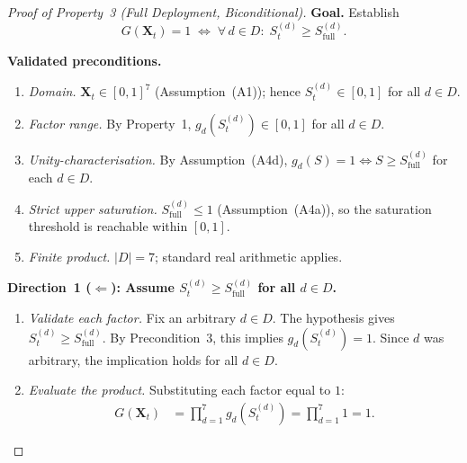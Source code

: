 \documentclass[12pt,openany]{book}
\numberwithin{equation}{chapter}
\theoremstyle{plain}
\theoremstyle{definition}
\theoremstyle{remark}
\def\mathcal#1{#1}%
\begin{document}
\begin{proof}[Proof of Property~3 (Full Deployment, Biconditional)]
\textbf{Goal.}  Establish
\begin{equation}
  G(\mathbf{X}_t) = 1
  \;\Longleftrightarrow\;
  \forall\, d \in \mathcal{D}:\;
  \mathcal{S}_t^{(d)} \geq \mathcal{S}_{\mathrm{full}}^{(d)}.
  \label{eq:P3-goal}
\end{equation}

\medskip\noindent
\textbf{Validated preconditions.}
\begin{enumerate}
  \item \emph{Domain.}  $\mathbf{X}_t\in[0,1]^7$
        (Assumption~(A1)); hence
        $\mathcal{S}_t^{(d)}\in[0,1]$ for all
        $d\in\mathcal{D}$.
  \item \emph{Factor range.}  By Property~1,
        $g_d\!\left(\mathcal{S}_t^{(d)}\right)\in[0,1]$
        for all $d\in\mathcal{D}$.
  \item \emph{Unity-characterisation.}
        By Assumption~(A4d),
        $g_d(\mathcal{S})=1 \Leftrightarrow
         \mathcal{S}\geq\mathcal{S}_{\mathrm{full}}^{(d)}$
        for each $d\in\mathcal{D}$.
  \label{rem:saturation}
  \item \emph{Strict upper saturation.}
        $\mathcal{S}_{\mathrm{full}}^{(d)}\leq 1$
        (Assumption~(A4a)), so the saturation threshold
        is reachable within $[0,1]$.
  \item \emph{Finite product.}
        $|\mathcal{D}|=7$; standard real arithmetic applies.
\end{enumerate}

\medskip
\noindent
\textbf{Direction~1 ($\Leftarrow$): Assume
$\mathcal{S}_t^{(d)}\geq\mathcal{S}_{\mathrm{full}}^{(d)}$
for all $d\in\mathcal{D}$.}
\begin{enumerate}
  \item \emph{Validate each factor.}
        Fix an arbitrary $d\in\mathcal{D}$.
        The hypothesis gives
        $\mathcal{S}_t^{(d)}\geq\mathcal{S}_{\mathrm{full}}^{(d)}$.
        By Precondition~3, this implies
        $g_d\!\left(\mathcal{S}_t^{(d)}\right)=1$.
        Since $d$ was arbitrary, the implication holds
        for all $d\in\mathcal{D}$.

  \item \emph{Evaluate the product.}
        Substituting each factor equal to $1$:
        \begin{align}
          G(\mathbf{X}_t)
          &= \prod_{d=1}^{7}
               g_d\!\left(\mathcal{S}_t^{(d)}\right)
           = \prod_{d=1}^{7} 1
           = 1.
          \label{eq:P3-bwd-result}
        \end{align}


\end{enumerate}
\end{proof}
\end{document}
